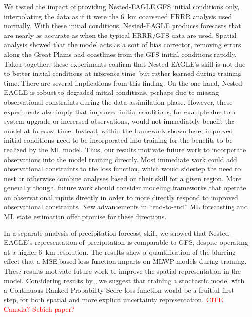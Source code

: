\documentclass[11pt]{article}
\newcommand{\red}[1]{\textcolor{red}{#1}}
\begin{document}
We tested the impact of providing Nested-EAGLE GFS initial conditions only,
interpolating the data as if it were the 6~km coarsened HRRR analysis used
normally.
With these initial conditions, Nested-EAGLE produces forecasts that are nearly
as accurate as when the typical HRRR/GFS data are used.
Spatial analysis showed that the model acts as a sort of bias
corrector, removing errors along the Great Plains and coastlines
from the GFS initial conditions rapidly.
Taken together, these experiments confirm that
Nested-EAGLE's skill is not due to better initial conditions at inference time,
but rather learned during training time.
There are several implications from this finding.
On the one hand, Nested-EAGLE is robust to degraded initial conditions,
perhaps due to missing observational constraints during the data assimilation
phase.
However, these experiments also imply that improved initial conditions, for
example due to a system upgrade or increased observations, would not immediately
benefit the model at forecast time.
Instead, within the framework shown here, improved initial conditions need to be
incorporated into training for the benefits to be realized by the ML model.
Thus, our results motivate future work to incorporate observations into the
model training directly.
Most immediate work could add observational constraints to the loss
function, which would sidestep the need to nest or otherwise combine analyses
based on their skill for a given region.
More generally though, future work should consider modeling frameworks that
operate on observational inputs directly in order to more directly respond to
improved observational constraints.
New advancements in ``end-to-end'' ML forecasting \citep{pinnington_aifs-dop_2026}
and ML state estimation \citep{gupta_healda_2026} offer promise for these
directions.

In a separate analysis of precipitation forecast skill, we showed that
Nested-EAGLE's representation of precipitation is comparable to GFS, despite
operating at a higher 6~km resolution.
The results show a quantification of the blurring effect that a MSE-based loss
function imparts on MLWP models during training.
These results motivate future work to improve the spatial representation in the
model.
Considering results by
\citet{nordhagen_high-resolution_2025,lang_aifs-crps_2026,alet_skillful_2025,bonev_fourcastnet_2025},
we suggest that training a stochastic model with a Continuous Ranked Probability
Score loss function would be a fruitful first step, for both spatial and more
explicit uncertainty representation.
\red{CITE Canada? Subich paper?}
\end{document}
